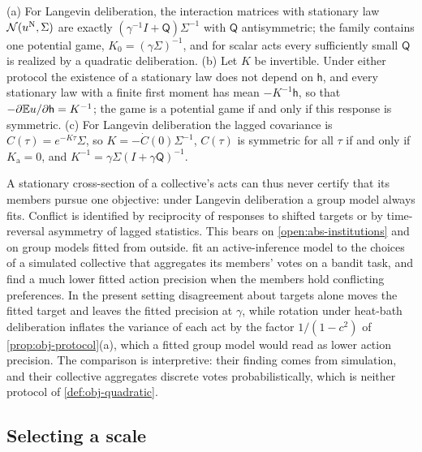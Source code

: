 \begin{proposition}\label{prop:obj-identification}
(a) For Langevin deliberation, the interaction matrices with stationary law $\mathcal{N}(u^{\mathrm N},\Sigma)$ are exactly $(\gamma^{-1}I+\mathsf Q)\Sigma^{-1}$ with $\mathsf Q$ antisymmetric; the family contains one potential game, $K_0=(\gamma\Sigma)^{-1}$, and for scalar acts every sufficiently small $\mathsf Q$ is realized by a quadratic deliberation. (b) Let $K$ be invertible. Under either protocol the existence of a stationary law does not depend on $\mathsf h$, and every stationary law with a finite first moment has mean $-K^{-1}\mathsf h$, so that $-\partial\mathbb{E} u/\partial\mathsf h=K^{-1}$; the game is a potential game if and only if this response is symmetric. (c) For Langevin deliberation the lagged covariance is $C(\tau)=e^{-K\tau}\Sigma$, so $K=-\dot C(0)\Sigma^{-1}$, $C(\tau)$ is symmetric for all $\tau$ if and only if $K_{\mathrm a}=0$, and $K^{-1}=\gamma\Sigma(I+\gamma\mathsf Q)^{-1}$.
\end{proposition}

A stationary cross-section of a collective's acts can thus never certify that its members pursue one objective: under Langevin deliberation a group model always fits. Conflict is identified by reciprocity of responses to shifted targets or by time-reversal asymmetry of lagged statistics. This bears on \cref{open:abs-institutions} and on group models fitted from outside. \citet{waade2025one} fit an active-inference model to the choices of a simulated collective that aggregates its members' votes on a bandit task, and find a much lower fitted action precision when the members hold conflicting preferences. In the present setting disagreement about targets alone moves the fitted target and leaves the fitted precision at $\gamma$, while rotation under heat-bath deliberation inflates the variance of each act by the factor $1/(1-c^2)$ of \cref{prop:obj-protocol}(a), which a fitted group model would read as lower action precision. The comparison is interpretive: their finding comes from simulation, and their collective aggregates discrete votes probabilistically, which is neither protocol of \cref{def:obj-quadratic}.

\subsection{Selecting a scale}\label{sec:obj-scale}

